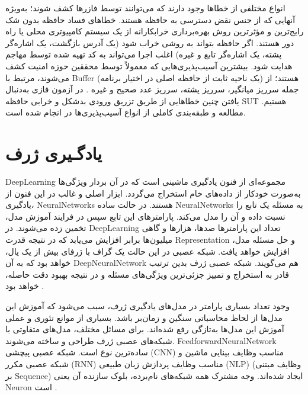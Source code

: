  
 انواع مختلفی از خطاها وجود دارند که می‌توانند توسط فازرها کشف شوند؛ به‌ویژه آنهایی که از جنس نقض دسترسی به حافظه هستند. خطاهای فساد حافظه بدون شک رایج‌ترین و مؤثرترین روش بهره‌برداری خرابکارانه از یک سیستم کامپیوتری محلی یا راه دور هستند. اگر حافظه بتواند به روشی خراب شود (یک آدرس بازگشت، یک اشاره‌گر پشته، یک اشاره‌گر تابع و غیره) اغلب اجرا می‌تواند به کد تهیه شده توسط مهاجم هدایت شود. بیشترین آسیب‌پذیری‌هایی که معمولاً توسط محققین حوزه امنیت کشف می‌شوند، مرتبط با \gls{Buffer} (یک ناحیه ثابت از حافظه اصلی در اختیار برنامه) هستند؛ از جمله سرریز میانگیر، سرریز پشته، سرریز عدد صحیح و غیره \cite{Takanen:2008:FSS:1404500}. در آزمون فازی به‌دنبال یافتن چنین خطاهایی از طریق تزریق ورودی بدشکل و خرابی حافظه \gls{SUT} هستیم. مطالعه و طبقه‌بندی کاملی از انواع آسیب‌پذیری‌ها در \cite{ZakeriSeminar2017} انجام شده است.  
 
 
 
 
 
 \section{یادگـیری ژرف}
  \gls{DeepLearning}
مجموعه‌ای از فنون یادگیری ماشینی است که در آن بردار ویژگی‌ها به‌صورت خودکار از داده‌های خام استخراج می‌گردد. ابزار اصلی و غالب در این فنون از یادگیری،  \glspl{NeuralNetwork} هستند. در حالت ساده \glspl{NeuralNetwork} به مسئله یک تابع را نسبت داده و آن را مدل می‌کند. پارامترهای این تابع سپس در فرایند آموزش مدل، تخمین زده می‌شوند. در \gls{DeepLearning} تعداد این پارامترها صدها، هزارها و گاهی میلیون‌ها برابر افزایش می‌یابد که در نتیجه قدرت  \gls{Representation} و حل مسئله مدل، افزایش خواهد یافت. شبکه عصبی در این حالت یک گراف با ژرفای بیش از یک یال، خواهد بود که به آن \gls{DeepNeuralNetwork} هم می‌گویند. شبکه عصبی ژرف بدین ترتیب قادر به استخراج و تمییز جزئی‌ترین ویژگی‌های مسئله و در نتیجه بهبود دقت حاصله، خواهد بود \cite{Goodfellow-et-al-2016}.
 
 
 وجود تعداد بسیاری پارامتر در مدل‌های یادگیری ژرف، سبب می‌شود که آموزش این مدل‌ها از لحاظ محاسباتی سنگین و زمان‌بر باشد. بسیاری از موانع تئوری و عملی آموزش این مدل‌ها به‌تازگی رفع شده‌اند. برای مسائل مختلف، مدل‌های متفاوتی با شبکه‌های عصبی ژرف طراحی و ساخته می‌شوند. \gls{FeedforwardNeuralNetwork} ساده‌ترین نوع است. شبکه عصبی پیچشی (\gls{CNN}) مناسب وظایف بینایی ماشین و شبکه عصبی مکرر (\gls{RNN}) مناسب وظایف پردازش زبان طبیعی (\gls{NLP}) (وظایف مبتنی بر \gls{Sequence}) ایجاد شده‌اند. وجه مشترک همه شبکه‌های نام‌برده، بلوک سازنده آن یعنی \gls{Neuron} است \cite{Jurafsky2017}. 
 
